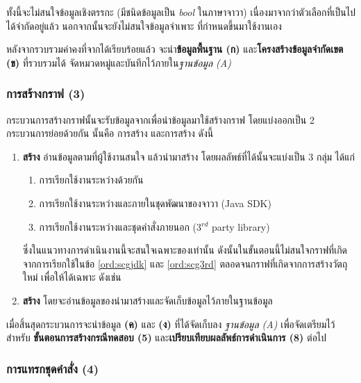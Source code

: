 ทั้งนี้จะไม่สนใจข้อมูลเชิงตรรกะ (มีชนิดข้อมูลเป็น {\it bool} ในภาษาจาวา) เนื่องมาจากว่าตัวเลือกที่เป็นไปได้จำกัดอยู่แล้ว 
นอกจากนั้นจะยังไม่สนใจข้อมูลจำเพาะ ที่กำหนดขึ้นมาใช้งานเอง 

หลังจากรวบรวมค่าคงที่จาก{\sourcecode}ได้เรียบร้อยแล้ว จะนำ{\bf ข้อมูลพื้นฐาน (ก)} และ{\bf โครงสร้างข้อมูลจำกัดเขต (ข)} ที่รวบรวมได้
จัดหมวดหมู่และบันทึกไว้ภายใน{\it ฐานข้อมูล (A)}

\subsubsection{การสร้างกราฟ (3)}

กระบวนการสร้างกราฟนั้นจะรับข้อมูล{\sourcecode}จาก{\Repository}เพื่อนำข้อมูลมาใช้สร้างกราฟ โดยแบ่งออกเป็น 2 กระบวนการย่อยด้วยกัน 
นั้นคือ การสร้าง{\scg} และการสร้าง{\cfg} ดังนี้

\begin{enumerate}
    \item {\bf สร้าง{\scg}} อ่านข้อมูล{\CUT}ตามที่ผู้ใช้งานสนใจ แล้วนำมาสร้าง{\scg} โดยผลลัพธ์ที่ได้นั้นจะแบ่งเป็น 3 กลุ่ม ได้แก่
        \begin{enumerate}
            \item การเรียกใช้งานระหว่าง{\CUT}ด้วยกัน \label{ord:scgcut}
            \item การเรียกใช้งานระหว่าง{\CUT}และ{\class}ภายในชุดพัฒนาของจาวา (Java SDK) \label{ord:scgjdk}
            \item การเรียกใช้งานระหว่าง{\CUT}และชุดคำสั่งภายนอก (3$^{rd}$ party library) \label{ord:scg3rd}
        \end{enumerate}
        ซึ่งในแนวทางการดำเนินงานนี้จะสนใจเฉพาะ{\scg}ของ{\CUT}เท่านั้น ดังนั้นในขั้นตอนนี้ไม่สนใจกราฟที่เกิดจากการเรียกใช้ในข้อ \ref{ord:scgjdk} 
        และ \ref{ord:scg3rd} ตลอดจนกราฟที่เกิดจากการสร้างวัตถุใหม่ เพื่อให้ได้{\scg}เฉพาะ{\CUT} ดังเช่น 

    \item {\bf สร้าง{\cfg}} โดยจะอ่านข้อมูลของ{\CUT}นำมาสร้าง{\cfg}และจัดเก็บข้อมูลไว้ภายในฐานข้อมูล
\end{enumerate}

เมื่อสิ้นสุดกระบวนการจะนำข้อมูล{\bf {\scg} (ค)} และ{\bf {\cfg} (ง)} ที่ได้จัดเก็บลง {\it ฐานข้อมูล (A)} เพื่อจัดเตรียมไว้สำหรับ 
{\bf ขั้นตอนการสร้างกรณีทดสอบ (5)} และ{\bf เปรียบเทียบผลลัพธ์การดำเนินการ (8)} ต่อไป

\subsubsection{การแทรกชุดคำสั่ง (4)}

